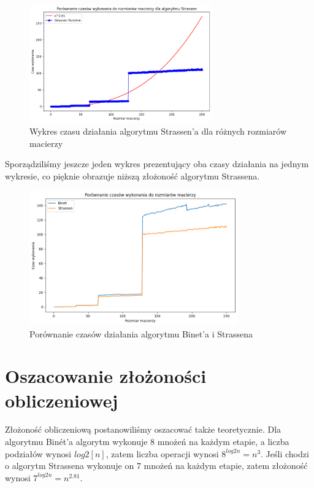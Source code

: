 \documentclass{article}
\begin{document}
\begin{figure}[H]
  \centering
    \includegraphics[width=0.7\textwidth]{images/strassen_runtime.png}
  \caption{Wykres czasu działania algorytmu Strassen'a dla różnych rozmiarów macierzy}
\end{figure}

\noindent
Sporządziliśmy jeszcze jeden wykres prezentujący oba czasy działania na jednym wykresie, co pięknie obrazuje niższą złożoność algorytmu Strassena.

\begin{figure}[H]
  \centering
    \includegraphics[width=0.8\textwidth]{images/binet_strassen_runtime.png}
  \caption{Porównanie czasów działania algorytmu Binet'a i Strassena}
\end{figure}

\section{Oszacowanie złożoności obliczeniowej}

Złożoność obliczeniową postanowiliśmy oszacować także teoretycznie. Dla algorytmu Binét'a algorytm wykonuje 8 mnożeń na każdym etapie, a liczba podziałów wynosi \(log{2}[n]\), zatem liczba operacji wynosi \(8^{log{2}{n}} = n^3\). Jeśli chodzi o algorytm Strassena wykonuje on 7 mnożeń na każdym etapie, zatem złożoność wynosi \(7^{log{2}{n}} = n^{2.81}\).
\end{document}
